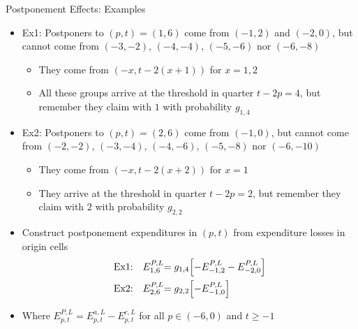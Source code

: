 \begin{frame}{Postponement Effects: Examples}
    \begin{itemize}
        \item Ex1: Postponers to $(p,t)=(1,6)$ come from $(-1,2)$ and $ (-2,0)$, but cannot come from $(-3,-2)$, $(-4,-4)$, $(-5,-6)$ nor $(-6,-8)$
        \begin{itemize}
            \item They come from $(-x,t-2(x+1))$ for $x=1,2$
            \item {All these groups arrive at the threshold in quarter $t-2p=4$, but remember they claim with $1$ with probability $g_{1,4}$}
        \end{itemize}

        \item Ex2: Postponers to $(p,t)=(2,6)$ come from $(-1,0)$, but cannot come from $(-2,-2)$, $(-3,-4)$, $(-4,-6)$, $(-5,-8)$ nor $(-6,-10)$
        \begin{itemize}
            \item They come from $(-x,t-2(x+2))$ for $x=1$
            \item {They arrive at the threshold in quarter $t-2p=2$, but remember they claim with $2$ with probability $g_{2,2}$}
        \end{itemize}

        \item {Construct postponement expenditures in $(p,t)$ from expenditure losses in origin cells}
        \begin{align*}
        \text{Ex1:}\quad
        {E^{P,L}_{1,6}}
        &{= g_{1,4}\Bigl[-E^{P,L}_{-1,2}-E^{P,L}_{-2,0}\Bigr]}
        \\
        \text{Ex2:}\quad
        {E^{P,L}_{2,6}}
        &{= g_{2,2}\Bigl[-E^{P,L}_{-1,0}\Bigr]}
        \end{align*}
        \item {Where $E^{P,L}_{p,t}=E^{a,L}_{p,t}-E^{c,L}_{p,t}$ for all $p\in (-6,0)$ and $t\geq -1$}
    \end{itemize}
\end{frame}

